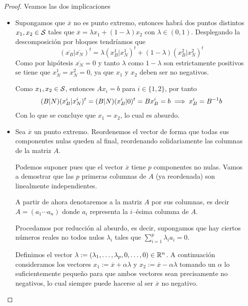 \begin{proof}
	Veamos las dos implicaciones
	\begin{itemize}
		\item[\bla] Supongamos que $\overline{x}$ no es punto extremo, entonces habrá dos puntos distintos $x_1,x_2\in\mathcal{S}$ tales que $\overline{x}=\lambda x_1+(1-\lambda)x_2$ con $\lambda\in(0,1)$. Desplegando la descomposición por bloques tendríamos que
		\begin{equation*}
			(\overline{x_B}|\overline{x_N})^t=\lambda(x_B^1|x_N^1)^t+(1-\lambda)(x_B^2|x_N^2)^t
		\end{equation*}
		Como por hipótesis $\overline{x_N}=0$ y tanto $\lambda$ como $1-\lambda$ son estrictamente positivos se tiene que $x_N^1=x_N^2=0$, ya que $x_1$ y $x_2$ deben ser no negativos.
		
		Como $x_1,x_2\in\mathcal{S}$, entonces $Ax_i=b$ para $i\in\{1,2\}$, por tanto
		\begin{equation*}
			(B|N)(x_B^i|x_N^i)^t=(B|N)(x_B^i|0)^t=Bx_B^i=b\implies x_B^i=B^{-1}b
		\end{equation*}
		Con lo que se concluye que $x_1=x_2$, lo cual es absurdo.
		\item[\bra] Sea $\overline{x}$ un punto extremo. Reordenemos el vector de forma que todas sus componentes nulas queden al final, reordenando solidariamente las columnas de la matriz $A$.
		
		Podemos suponer pues que el vector $\overline{x}$ tiene $p$ componentes no nulas. Vamos a demostrar que las $p$ primeras columnas de $A$ (ya reordenada) son linealmente independientes. 
		
		A partir de ahora denotaremos a la matriz $A$ por sus columnas, es decir $A=(a_1\cdots a_n)$ donde $a_i$ representa la $i$--ésima columna de $A$.
		
		Procedamos por reducción al absurdo, es decir, supongamos que hay ciertos números reales no todos nulos $\lambda_i$ tales que $\sum_{i=1}^{p}\lambda_ia_i=0$.
		
		Definimos el vector $\lambda:=(\lambda_1,\dots,\lambda_p,0,\dots,0)\in\mathbb{R}^n$. A continuación consideramos los vectores  $x_1:=\overline{x}+\alpha\lambda$ y $x_2:=\overline{x}-\alpha\lambda$ tomando un $\alpha$ lo suficientemente pequeño para que ambos vectores sean precisamente no negativos, lo cual siempre puede hacerse al ser $\overline{x}$ no negativo.
		

\end{itemize}
\end{proof}
